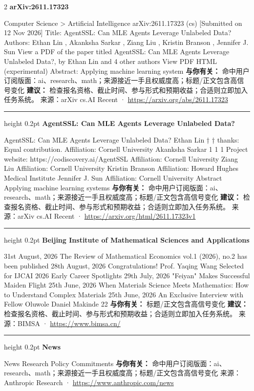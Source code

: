 \documentclass[10.5pt]{ctexart}
\begin{document}
\begin{multicols}{2}
{\large\bfseries arXiv:2611.17323}\par
Computer Science > Artificial Intelligence arXiv:2611.17323 (cs) [Submitted on 12 Nov 2026] Title: AgentSSL: Can MLE Agents Leverage Unlabeled Data? Authors: Ethan Lin , Akanksha Sarkar , Ziang Liu , Kristin Branson , Jennifer J. Sun View a PDF of the paper titled AgentSSL: Can MLE Agents Leverage Unlabeled Data?, by Ethan Lin and 4 other authors View PDF HTML (experimental) Abstract: Applying machine learning system
\textbf{与你有关：} 命中用户订阅版面：ai、research、math；来源接近一手且权威度高；标题/正文包含高信号变化
\textbf{建议：} 检查报名资格、截止时间、参与形式和预期收益；合适则立即加入任务系统。
{\footnotesize\color{ormuted} 来源：arXiv cs.AI Recent · \url{https://arxiv.org/abs/2611.17323}}
\vspace{2mm}
\hrule height 0.2pt
\vspace{2mm}
{\large\bfseries AgentSSL: Can MLE Agents Leverage Unlabeled Data?}\par
AgentSSL: Can MLE Agents Leverage Unlabeled Data? Ethan Lin † † thanks: Equal contribution. Affiliation: Cornell University Akanksha Sarkar 1 1 1 Project website: https://codiscovery.ai/AgentSSL Affiliation: Cornell University Ziang Liu Affiliation: Cornell University Kristin Branson Affiliation: Howard Hughes Medical Institute Jennifer J. Sun Affiliation: Cornell University Abstract Applying machine learning systems
\textbf{与你有关：} 命中用户订阅版面：ai、research、math；来源接近一手且权威度高；标题/正文包含高信号变化
\textbf{建议：} 检查报名资格、截止时间、参与形式和预期收益；合适则立即加入任务系统。
{\footnotesize\color{ormuted} 来源：arXiv cs.AI Recent · \url{https://arxiv.org/html/2611.17323v1}}
\vspace{2mm}
\hrule height 0.2pt
\vspace{2mm}
{\large\bfseries Beijing Institute of Mathematical Sciences and Applications}\par
31st August, 2026 The Review of Mathematical Economics vol.1 (2026), no.2 has been published 28th August, 2026 Congratulations! Prof. Yaqing Wang Selected for IJCAI 2026 Early Career Spotlights 29th July, 2026 "Feiyan" Makes Successful Maiden Flight 25th June, 2026 When Materials Science Meets Mathematics: How to Understand Complex Materials 25th June, 2026 An Exclusive Interview with Fellow Oluwole Daniel Makinde 22
\textbf{与你有关：} 标题/正文包含高信号变化
\textbf{建议：} 检查报名资格、截止时间、参与形式和预期收益；合适则立即加入任务系统。
{\footnotesize\color{ormuted} 来源：BIMSA · \url{https://www.bimsa.cn/}}
\vspace{2mm}
\hrule height 0.2pt
\vspace{2mm}
{\large\bfseries News}\par
News Research Policy Commitments
\textbf{与你有关：} 命中用户订阅版面：ai、research、math；来源接近一手且权威度高；标题/正文包含高信号变化
{\footnotesize\color{ormuted} 来源：Anthropic Research · \url{https://www.anthropic.com/news}}
\end{multicols}
\end{document}
